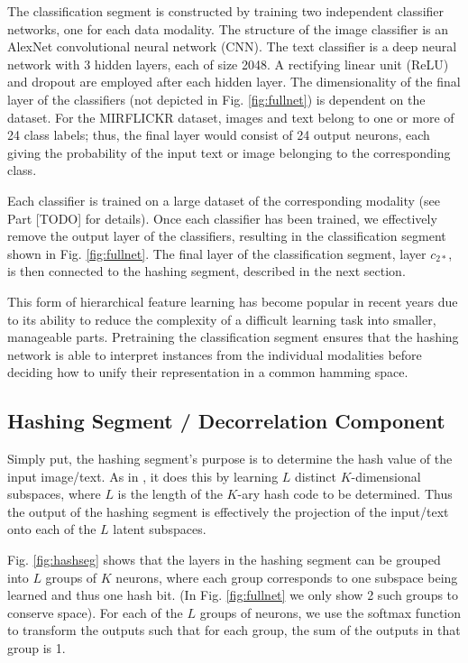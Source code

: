 \documentclass[letterpaper]{article}
\begin{document}
The classification segment is constructed by training two independent classifier networks, one for each data modality. The structure of the image classifier is an AlexNet \cite{alexnet} convolutional neural network (CNN). The text classifier is a deep neural network with 3 hidden layers, each of size 2048. A rectifying linear unit (ReLU) and dropout are employed after each hidden layer. The dimensionality of the final layer of the classifiers (not depicted in Fig. \ref{fig:fullnet}) is dependent on the dataset. For the MIRFLICKR \cite{flickr} dataset, images and text belong to one or more of 24 class labels; thus, the final layer would consist of 24 output neurons, each giving the probability of the input text or image belonging to the corresponding class.

Each classifier is trained on a large dataset of the corresponding modality (see Part [TODO] for details). Once each classifier has been trained, we effectively remove the output layer of the classifiers, resulting in the classification segment shown in Fig. \ref{fig:fullnet}. The final layer of the classification segment, layer $ c_{2*} $, is then connected to the hashing segment, described in the next section.

This form of hierarchical feature learning has become popular in recent years \cite{dvsh,dcmh,autoen,chn,cdq} due to its ability to reduce the complexity of a difficult learning task into smaller, manageable parts. Pretraining the classification segment ensures that the hashing network is able to interpret instances from the individual modalities before deciding how to unify their representation in a common hamming space.

\subsection{Hashing Segment / Decorrelation Component}

Simply put, the hashing segment's purpose is to determine the hash value of the input image/text. As in \cite{kai}, it does this by learning $ L $ distinct $ K $-dimensional subspaces, where $ L $ is the length of the $ K $-ary hash code to be determined. Thus the output of the hashing segment is effectively the projection of the input/text onto each of the $ L $ latent subspaces.

Fig. \ref{fig:hashseg} shows that the layers in the hashing segment can be grouped into $ L $ groups of $ K $ neurons, where each group corresponds to one subspace being learned and thus one hash bit. (In Fig. \ref{fig:fullnet} we only show 2 such groups to conserve space). For each of the $ L $ groups of neurons, we use the softmax function to transform the outputs such that for each group, the sum of the outputs in that group is 1.
\end{document}
